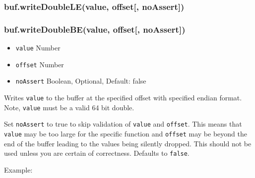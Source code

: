 \subsubsection{buf.writeDoubleLE(value, offset{[},
noAssert{]})}\label{buf.writedoublelevalue-offset-noassert}

\subsubsection{buf.writeDoubleBE(value, offset{[},
noAssert{]})}\label{buf.writedoublebevalue-offset-noassert}

\begin{itemize}
\itemsep1pt\parskip0pt
\item
  \texttt{value} Number
\item
  \texttt{offset} Number
\item
  \texttt{noAssert} Boolean, Optional, Default: false
\end{itemize}

Writes \texttt{value} to the buffer at the specified offset with
specified endian format. Note, \texttt{value} must be a valid 64 bit
double.

Set \texttt{noAssert} to true to skip validation of \texttt{value} and
\texttt{offset}. This means that \texttt{value} may be too large for the
specific function and \texttt{offset} may be beyond the end of the
buffer leading to the values being silently dropped. This should not be
used unless you are certain of correctness. Defaults to \texttt{false}.

Example:

\begin{Shaded}
\begin{Highlighting}[]
  \NormalTok{(}\NormalTok{);}
\NormalTok{(}\NormalTok{, }\NormalTok{);}


\NormalTok{(}\NormalTok{, }\NormalTok{);}


\end{Highlighting}
\end{Shaded}

